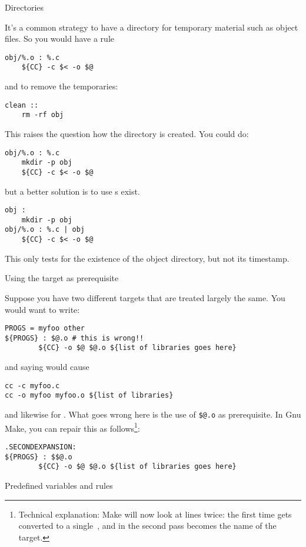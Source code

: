  {Directories}

It's a common strategy to have a directory for temporary material
such as object files. So you would have a rule
\begin{verbatim}
obj/%.o : %.c
    ${CC} -c $< -o $@
\end{verbatim}
and to remove the temporaries:
\begin{verbatim}
clean ::
    rm -rf obj
\end{verbatim}
This raises the question how the  directory is created.
You could do:
\begin{verbatim}
obj/%.o : %.c
    mkdir -p obj
    ${CC} -c $< -o $@
\end{verbatim}
but a better solution is to use
s exist.
\begin{verbatim}
obj :
    mkdir -p obj
obj/%.o : %.c | obj
    ${CC} -c $< -o $@
\end{verbatim}
This only tests for the existence of the object directory,
but not its timestamp.

 {Using the target as prerequisite}

Suppose you have two different targets that are treated largely the
same. You would want to write:
\begin{verbatim}
PROGS = myfoo other
${PROGS} : $@.o # this is wrong!!
        ${CC} -o $@ $@.o ${list of libraries goes here}
\end{verbatim}
and saying  would cause 
\begin{verbatim}
cc -c myfoo.c
cc -o myfoo myfoo.o ${list of libraries}
\end{verbatim}
and likewise for . What goes wrong here is the use of
\verb+$@.o+ as prerequisite. In Gnu Make, you can repair this as
follows\footnote{Technical explanation: Make will now look at lines
  twice: the first time \n{\$\$} gets converted to a single~\n{\$},
  and in the second pass  becomes the name of the target.}:
\begin{verbatim}
.SECONDEXPANSION:
${PROGS} : $$@.o
        ${CC} -o $@ $@.o ${list of libraries goes here}
\end{verbatim}


 {Predefined variables and rules}

